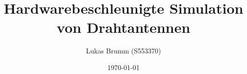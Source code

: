 \documentclass[11pt, ngerman]{article}
\begin{document}
\newcommand*{\Ef}[3]{%
	\IfEqCase{#3}{%
		{+}{E_{#1}^{#2}\vert_{t+\Delta t}}%
		{-}{E_{#1}^{#2}\vert_{t-\Delta t}}%
		{0}{E_{#1}^{#2}\vert_{t}}%
		{T}{E_{#1}^{#2}\vert_{T}}%
	}[\PackageError{tree}{Undefined option to Ef: #1}{}]%
}

\newcommand*{\Hf}[3]{%
	\IfEqCase{#3}{%
		{+}{\widetilde{H_{#1}}^{#2}\vert_{t+\frac{\Delta t}{2}}}%
		{-}{\widetilde{H_{#1}}^{#2}\vert_{t-\frac{\Delta t}{2}}}%
		{0}{\widetilde{H_{#1}}^{#2}\vert_{t}}%
		{T}{\widetilde{H_{#1}}^{#2}\vert_{T}}%
	}[\PackageError{tree}{Undefined option to Hf: #1}{}]%
}

\newcommand*{\Ch}[3]{%
	\IfEqCase{#3}{%
		{+}{C_{#1}^H\vert_{t+\frac{\Delta t}{2}}^{#2}}%
		{-}{C_{#1}^H\vert_{t-\frac{\Delta t}{2}}^{#2}}%
		{0}{C_{#1}^H\vert_{t}^{#2}}%
		{T}{C_{#1}^H\vert_{T}^{#2}}%
		{T+}{C_{#1}^H\vert_{T+\frac{\Delta t}{2}}^{#2}}%
	}[\PackageError{tree}{Undefined option to Cf: #1}{}]%
}

\newcommand*{\Ce}[3]{%
	\IfEqCase{#3}{%
		{+}{C_{#1}^E\vert_{t+\frac{\Delta t}{2}}^{#2}}%
		{-}{C_{#1}^E\vert_{t-\frac{\Delta t}{2}}^{#2}}%
		{0}{C_{#1}^E\vert_{t}^{#2}}%
		{T}{C_{#1}^E\vert_{T}^{#2}}%
		{T+}{C_{#1}^E\vert_{T+\frac{\Delta t}{2}}^{#2}}%
	}[\PackageError{tree}{Undefined option to Cf: #1}{}]%
}

\newcommand*{\dt}[3]{%
	\begin{bmatrix}
		{#1} & 0 & 0\\
		0 & {#2} & 0\\
		0 & 0 & {#3}
	\end{bmatrix}
}

\newcommand*{\sgma}{\sigma^`}
\newcommand*{\sollsein}{\stackrel{!}{=}}

\newcommand*{\mone}{\frac{\sgma_y+\sgma_z}{2\epsilon_0} + \frac{\sgma_y\sgma_z\Delta t}{4\epsilon_0} + \frac{1}{\Delta t}}
\newcommand*{\fone}{-\frac{\sgma_y+\sgma_z}{2\epsilon_0} + \frac{\sgma_y\sgma_z\Delta t}{4\epsilon_0} + \frac{1}{\Delta t}}

\newcommand{\source}[1]{\caption*{Source: {#1}} }


\title{Hardwarebeschleunigte Simulation von Drahtantennen}
\author{Lukas Brumm (S553370)}
\date{\today}
\maketitle
\newpage
\end{document}
